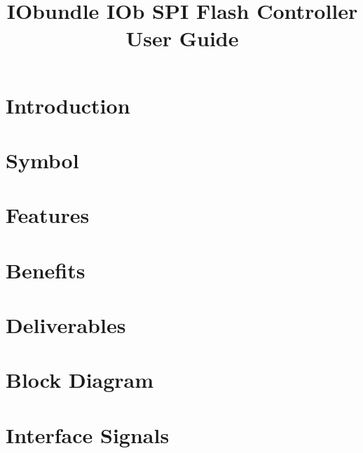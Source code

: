 \documentclass{../../submodules/TEX/document/ug/ug}
\title{IObundle IOb SPI Flash Controller User Guide}
\theoremstyle{plain}
\begin{document}
\maketitle
\cleardoublepage
\tableofcontents
\clearpage
\listoftables
\clearpage
\listoffigures
\cleardoublepage

\section{\textcolor[rgb]{0,0,0}{Introduction}}


\section{Symbol}


\section{\textcolor[rgb]{0,0,0}{Features}}


\section{\textcolor[rgb]{0,0,0}{Benefits}}


\section{\textcolor[rgb]{0,0,0}{Deliverables}}


\section*{\textcolor[rgb]{0,0,0}{Block Diagram}}


\section{Interface Signals}
\end{document}

